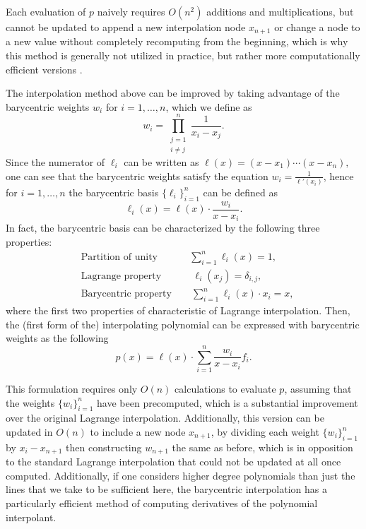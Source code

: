 \documentclass[11pt,letterpaper]{article}
\newcommand{\free}[1]{{\textcolor{red}{#1}}}
\theoremstyle{definition}
\newcommand{\6}{\mathbf}
\newcommand{\7}{\mathcal}
\begin{document}
Each evaluation of $p$ naively requires $O(n^2)$ additions and multiplications, but cannot be updated to append a new interpolation node $x_{n+1}$ or change a node to a new value without completely recomputing from the beginning, which is why this method is generally not utilized in practice, but rather more computationally efficient versions \cite{Trefethen}.


The interpolation method above can be improved by taking advantage of the barycentric weights $w_i$ for $i=1, \dots, n$, which we define as 
$$w_i = \prod\limits_{\substack{{j=1} \\ {i \neq j}}}^n \frac{1}{x_i - x_j}.$$
Since the numerator of $\ell_i$ can be written as 
$\ell(x) = (x-x_1) \cdots (x-x_n),$
one can see that the barycentric weights satisfy the equation $w_i = \frac{1}{\ell'(x_i)}$, hence for $i=1, \dots, n$ the barycentric basis $\{\ell_i\}_{i=1}^n$ can be defined as 
$$\ell_i(x) = \ell(x) \cdot \frac{w_i}{x-x_i}.$$
In fact, the barycentric basis can be characterized by the following three properties:
\begin{align*}
    & \text{Partition of unity} \quad \quad \quad \ \sum_{i=1}^n \ell_i(x) = 1, \\
    & \text{Lagrange property} \quad \quad \quad \, \ell_i(x_j) = \delta_{i,j}, \\
    & \text{Barycentric property} \quad \quad \sum_{i=1}^n \ell_i(x) \cdot x_i = x,
\end{align*}
where the first two properties of characteristic of Lagrange interpolation.
Then, the (first form of the) interpolating polynomial can be expressed with barycentric weights as the following
$$p(x) = \ell(x) \cdot \sum_{i=1}^n \frac{w_i}{x-x_i} f_i.$$



This formulation requires only $O(n)$ calculations to evaluate $p$, assuming that the weights $\{w_i\}_{i=1}^n$ have been precomputed, which is a substantial improvement over the original Lagrange interpolation.
Additionally, this version can be updated in $O(n)$ to include a new node $x_{n+1}$, by dividing each weight $\{w_i\}_{i=1}^n$ by $x_i - x_{n+1}$ then constructing $w_{n+1}$ the same as before, which is in opposition to the standard Lagrange interpolation that could not be updated at all once computed.
Additionally, if one considers higher degree polynomials than just the lines that we take to be sufficient here, the barycentric interpolation has a particularly efficient method of computing derivatives of the polynomial interpolant.
\end{document}
